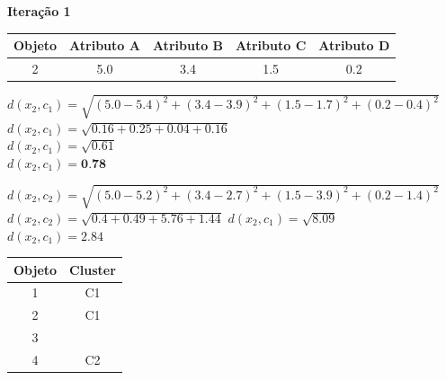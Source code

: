 \documentclass{article}
\begin{document}
  \textbf{Iteração 1}

  \begin{table}[H]
    \centering
    \begin{tabular}{|c|c|c|c|c|}
    \hline
    \rowcolor[HTML]{EFEFEF} 
    \textbf{Objeto} & \textbf{Atributo A} & \textbf{Atributo B} & \textbf{Atributo C} & \textbf{Atributo D} \\ \hline
    2               & 5.0                 & 3.4                 & 1.5                 & 0.2                 \\ \hline
    \end{tabular}
  \end{table}

  \begin{center}
    $d(x_2,c_1) = \sqrt{(5.0 - 5.4)^2 + (3.4 - 3.9)^2 + (1.5 - 1.7)^2 + (0.2 - 0.4)^2} $  \\
    $d(x_2,c_1) = \sqrt{0.16 + 0.25 + 0.04 + 0.16} $  \\
    $d(x_2,c_1) = \sqrt{0.61} $ \\ 
    $d(x_2,c_1) = \textbf{0.78} $ \\
  \end{center}

  \begin{center}
    $d(x_2, c_2) =  \sqrt{(5.0 - 5.2)^2 + (3.4 - 2.7)^2 + (1.5 - 3.9)^2 + (0.2 - 1.4)^2} $ \\
    $d(x_2, c_2) = \sqrt{ 0.4 + 0.49 +  5.76 + 1.44}$
    $d(x_2,c_1) = \sqrt{8.09} $ \\
    $d(x_2,c_1) =  2.84 $\\
  \end{center}

  \begin{table}[H]
    \centering
    \begin{tabular}{|c|c|}
    \hline
    \rowcolor[HTML]{EFEFEF} 
    \textbf{Objeto} & \textbf{Cluster} \\ \hline
    1               & C1               \\ \hline
    2               & C1               \\ \hline
    3               &                  \\ \hline
    4               & C2               \\ \hline
    \end{tabular}
  \end{table}
\end{document}
